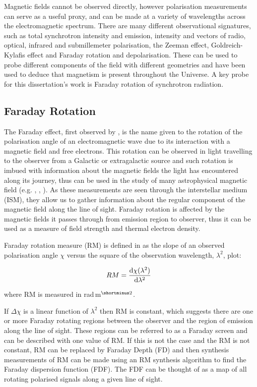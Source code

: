 Magnetic fields cannot be observed directly, however polarisation measurements can serve as a useful proxy, and can be made at a variety of wavelengths across the electromagnetic spectrum. There are many different observational signatures, such as total synchrotron intensity and emission, intensity and vectors of radio, optical, infrared and submillemeter polarisation, the Zeeman effect, Goldreich-Kylafis effect and Faraday rotation and depolarisation. These  can be used to probe different components of the field with different geometries and have been used to deduce that magnetism is present throughout the Universe. A key probe for this dissertation's work is Faraday rotation of synchrotron radiation.


\subsection{Faraday Rotation}
\label{sec: Faraday rotation}

 The Faraday effect, first observed by \cite{original_Faraday_rotation}, is the name given to the rotation of the polarisation angle of an electromagnetic wave due to its interaction with a magnetic field and free electrons. This rotation can be observed in light travelling to the observer from a Galactic or extragalactic source and such rotation is imbued with information about the magnetic fields the light has encountered along its journey, thus can be used in the study of many astrophysical magnetic field (e.g. \cite{FR_cluster}, \cite{FR_sagA}, \cite{FR_planet_nebula}). As these measurements are seen through the interstellar medium (ISM), they allow us to gather information about the regular component of the magnetic field along the line of sight. Faraday rotation is affected by the magnetic fields it passes through from emission region to observer, thus it can be used as a measure of field strength and thermal electron density.

Faraday rotation measure (RM) is defined in \cite{burn_1966} as the slope of an observed polarisation angle $\chi$ versus the square of the observation wavelength, $\lambda^2$, plot:

\begin{equation}
    RM = \frac{{\rm d}\chi (\lambda^2)}{{\rm d}\lambda^2}
    \label{Eq: rotation measure}
\end{equation}

\noindent where RM is measured in rad$\,$m$^{\shortminus2}$.

If $\Delta \chi$ is a linear function of $\lambda^2$ then RM is constant, which suggests there are one or more Faraday rotating regions between the observer and the region of emission along the line of sight. These regions can be referred to as a Faraday screen and can be described with one value of RM. If this is not the case and the RM is not constant, RM can be replaced by Faraday Depth (FD) and then synthesis measurements of RM can be made using an RM synthesis algorithm to find the Faraday dispersion function (FDF). The FDF can be thought of as a map of all rotating polarised signals along a given line of sight.

